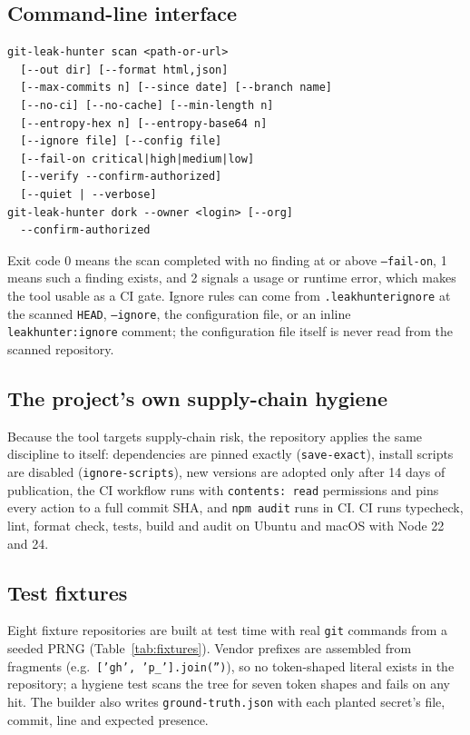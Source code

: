 \documentclass[conference]{IEEEtran}
\newcommand{\code}[1]{\texttt{#1}}
\begin{document}
\subsection{Command-line interface}
\begin{lstlisting}
git-leak-hunter scan <path-or-url>
  [--out dir] [--format html,json]
  [--max-commits n] [--since date] [--branch name]
  [--no-ci] [--no-cache] [--min-length n]
  [--entropy-hex n] [--entropy-base64 n]
  [--ignore file] [--config file]
  [--fail-on critical|high|medium|low]
  [--verify --confirm-authorized]
  [--quiet | --verbose]
git-leak-hunter dork --owner <login> [--org]
  --confirm-authorized
\end{lstlisting}
Exit code 0 means the scan completed with no finding at or above \code{--fail-on}, 1 means such a
finding exists, and 2 signals a usage or runtime error, which makes the tool usable as a CI gate.
Ignore rules can come from \code{.leakhunterignore} at the scanned \code{HEAD}, \code{--ignore},
the configuration file, or an inline \code{leakhunter:ignore} comment; the configuration file
itself is never read from the scanned repository.

\subsection{The project's own supply-chain hygiene}
Because the tool targets supply-chain risk, the repository applies the same discipline to itself:
dependencies are pinned exactly (\code{save-exact}), install scripts are disabled
(\code{ignore-scripts}), new versions are adopted only after 14 days of publication, the CI
workflow runs with \code{contents: read} permissions and pins every action to a full commit SHA,
and \code{npm audit} runs in CI. CI runs typecheck, lint, format check, tests, build and audit on
Ubuntu and macOS with Node 22 and 24.

\subsection{Test fixtures}
Eight fixture repositories are built at test time with real \code{git} commands from a seeded PRNG
(Table~\ref{tab:fixtures}). Vendor prefixes are assembled from fragments (e.g.\ \code{['gh',
'p\_'].join('')}), so no token-shaped literal exists in the repository; a hygiene test scans the
tree for seven token shapes and fails on any hit. The builder also writes \code{ground-truth.json}
with each planted secret's file, commit, line and expected presence.
\end{document}
